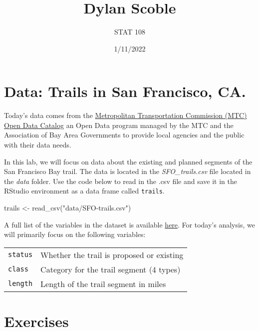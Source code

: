 \documentclass[
]{article}
\title{Dylan Scoble}
\author{STAT 108}
\date{1/11/2022}
\newenvironment{Shaded}{\begin{snugshade}}{\end{snugshade}}
\newcommand{\FunctionTok}[1]{\textcolor[rgb]{0.00,0.00,0.00}{#1}}
\newcommand{\NormalTok}[1]{#1}
\newcommand{\OtherTok}[1]{\textcolor[rgb]{0.56,0.35,0.01}{#1}}
\newcommand{\StringTok}[1]{\textcolor[rgb]{0.31,0.60,0.02}{#1}}
\begin{document}
\maketitle

\hypertarget{data-trails-in-san-francisco-ca.}{%
\section{Data: Trails in San Francisco,
CA.}\label{data-trails-in-san-francisco-ca.}}

Today's data comes from the
\href{https://opendata.mtc.ca.gov/datasets/MTC::san-francisco-bay-trail/about}{Metropolitan
Transportation Commission (MTC) Open Data Catalog} an Open Data program
managed by the MTC and the Association of Bay Area Governments to
provide local agencies and the public with their data needs.

In this lab, we will focus on data about the existing and planned
segments of the San Francisco Bay trail. The data is located in the
\emph{SFO\_trails.csv} file located in the \emph{data} folder. Use the
code below to read in the .csv file and save it in the RStudio
environment as a data frame called \texttt{trails}.

\begin{Shaded}
\begin{Highlighting}[]
\NormalTok{trails }\OtherTok{\textless{}{-}} \FunctionTok{read\_csv}\NormalTok{(}\StringTok{"data/SFO{-}trails.csv"}\NormalTok{)}
\end{Highlighting}
\end{Shaded}

A full list of the variables in the dataset is available
\href{https://opendata.mtc.ca.gov/datasets/MTC::san-francisco-bay-trail/about}{here}.
For today's analysis, we will primarily focus on the following
variables:

\begin{longtable}[]{@{}ll@{}}
\toprule
\endhead
\texttt{status} & Whether the trail is proposed or existing \\
\texttt{class} & Category for the trail segment (4 types) \\
\texttt{length} & Length of the trail segment in miles \\
\bottomrule
\end{longtable}

\hypertarget{exercises}{%
\section{Exercises}\label{exercises}}
\end{document}
